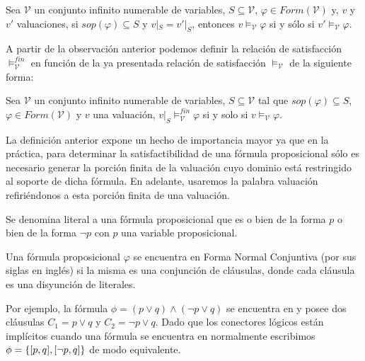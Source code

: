 \begin{remark}
Sea $\mathcal{V}$ un conjunto infinito numerable de variables, $S \subseteq \mathcal{V}$, $\varphi \in \mathit{Form}(\mathcal{V})$ y, $v$ y $v'$ valuaciones, si $\mathit{sop}(\varphi) \subseteq S$ y $v|_S = v'|_S$, entonces $v \models_\mathcal{V} \varphi$ si y sólo si $v' \models_\mathcal{V} \varphi$.
\end{remark}

A partir de la observación anterior podemos definir la relación de satisfacción $\models^\mathit{fin}_\mathcal{V}$ en función de la ya presentada relación de satisfacción $\models_\mathcal{V}$ de la siguiente forma:

\begin{definition}
Sea $\mathcal{V}$ un conjunto infinito numerable de variables, $S \subseteq \mathcal{V}$ tal que $\mathit{sop}(\varphi) \subseteq S$, $\varphi \in \mathit{Form}(\mathcal{V})$ y $v$ una valuación, $v|_S \models^\mathit{fin}_\mathcal{V} \varphi$ si y solo si $v \models_\mathcal{V} \varphi$.
\end{definition}

La definición anterior expone un hecho de importancia mayor ya que en la práctica, para determinar la satisfactibilidad de una fórmula proposicional sólo es necesario generar la porción finita de la valuación cuyo dominio está restringido al soporte de dicha fórmula. En adelante, usaremos la palabra valuación refiriéndonos a esta porción finita de una valuación.

\begin{definition}  
Se denomina literal a una fórmula proposicional que es o bien de la forma $p$ o bien de la forma $\neg p$ con $p$ una variable proposicional.
\end{definition}

\begin{definition}  
Una fórmula proposicional $\varphi$ se encuentra en Forma Normal Conjuntiva (\cnf por sus siglas en inglés) si la misma es una conjunción de cláusulas, donde cada cláusula es una disyunción de literales. 
\end{definition}

Por ejemplo, la fórmula $\phi = (p \vee q) \wedge (\neg p \vee q)$ se encuentra
en \cnf y posee dos cláusulas $C_1 = p \vee q$ y $C_2 = \neg p \vee q$. Dado que los
conectores lógicos están implícitos cuando una fórmula se encuentra en \cnf
normalmente escribimos $\phi = \{[p, q], [\neg p, q]\}$ de modo equivalente.

